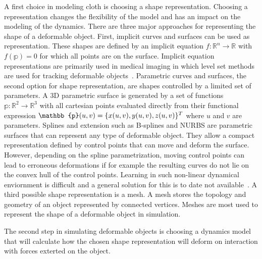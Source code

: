 \documentclass[\home/main.tex]{subfiles}
\begin{document}
A first choice in modeling cloth is choosing a shape representation. Choosing a representation changes the flexibility of the model and has an impact on the modeling of the dynamics. There are three major approaches for representing the shape of a deformable object. First, implicit curves and surfaces can be used as representation. These shapes are defined by an implicit equation $f: \mathbb{R}^{n} \rightarrow \mathbb{R}$ with $f(\mathbb{p}) = 0$ for which all points are on the surface. Implicit equation representations are primarily used in medical imaging in which level set methods are used for tracking deformable objects~\autocite{Cremers2006}. Parametric curves and surfaces, the second option for shape representation, are shapes controlled by a limited set of parameters. A 3D parametric surface is generated by a set of functions $\mathbb{p}: \mathbb{R}^{2} \rightarrow \mathbb{R}^{3}$ with all cartesian points evaluated directly from their functional expression $\mathbb{p}(u, v) =\\ \{x(u, v), y(u, v), z(u, v)\}^{T}$ where $u$ and $v$ are parameters. Splines and extension such as B-splines and NURBS are parametric surfaces that can represent any type of deformable object. They allow a compact representation defined by control points that can move and deform the surface. However, depending on the spline parametrization, moving control points can lead to erroneous deformations if for example the resulting curves do not lie on the convex hull of the control points. Learning in such non-linear dynamical enviornment is difficult and a general solution for this is to date not available~\autocite{rios2020}. A third possible shape representation is a mesh. A mesh stores the topology and geometry of an object represented by connected vertices. Meshes are most used to represent the shape of a deformable object in simulation. 



The second step in simulating deformable objects is choosing a dynamics model that will calculate how the chosen shape representation will deform on interaction with forces exterted on the object. 
\end{document}
